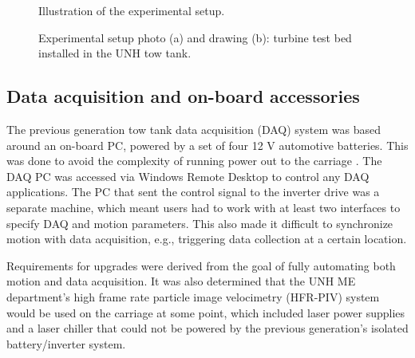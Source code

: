 \begin{figure}[ht]
    \centering
    \caption{Illustration of the experimental setup.}
    \label{fig:exp-setup}
\end{figure}


\begin{figure}[ht]
    \centering
    
    
    \caption{Experimental setup photo (a) and drawing (b): turbine test bed
        installed in the UNH tow tank.}
    
    \label{fig:exp-setup}
\end{figure}




\subsection{Data acquisition and on-board accessories}

The previous generation tow tank data acquisition (DAQ) system was based around
an on-board PC, powered by a set of four 12 V automotive batteries. This was
done to avoid the complexity of running power out to the carriage
\cite{Darnell1996}. The DAQ PC was accessed via Windows Remote Desktop to
control any DAQ applications. The PC that sent the control signal to the
inverter drive was a separate machine, which meant users had to work with at
least two interfaces to specify DAQ and motion parameters. This also made it
difficult to synchronize motion with data acquisition, e.g., triggering data
collection at a certain location.

Requirements for upgrades were derived from the goal of fully automating both
motion and data acquisition. It was also determined that the UNH ME department's
high frame rate particle image velocimetry (HFR-PIV) system would be used on the
carriage at some point, which included laser power supplies and a laser chiller
that could not be powered by the previous generation's isolated battery/inverter
system.

